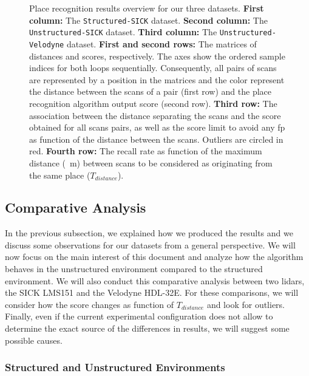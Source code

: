 \begin{figure}[H]
    \caption[Place recognition results overview for our three datasets.]{Place recognition results overview for our three datasets. \textbf{First column:} The \texttt{Structured-SICK} dataset. \textbf{Second column:} The \texttt{Unstructured-SICK} dataset. \textbf{Third column:} The \texttt{Unstructured-Velodyne} dataset. \textbf{First and second rows:} The matrices of distances and scores, respectively. The axes show the ordered sample indices for both loops sequentially. Consequently, all pairs of scans are represented by a position in the matrices and the color represent the distance between the scans of a pair (first row) and the place recognition algorithm output score (second row). \textbf{Third row:} The association between the distance separating the scans and the score obtained for all scans pairs, as well as the score limit to avoid any \gls*{fp} as function of the distance between the scans. Outliers are circled in red. \textbf{Fourth row:} The recall rate as function of the maximum distance (\SI{}{\meter}) between scans to be considered as originating from the same place ($T_{distance}$).} 
    \label{fig:chap_slam_results}
\end{figure}

\subsection{Comparative Analysis}
\label{ssec:chap_slam_comparative_analysis}

In the previous subsection, we explained how we produced the results and we discuss some observations for our datasets from a general perspective. We will now focus on the main interest of this document and analyze how the algorithm behaves in the unstructured environment compared to the structured environment. We will also conduct this comparative analysis between two \gls*{lidar}s, the SICK LMS151 and the Velodyne HDL-32E. For these comparisons, we will consider how the score changes as function of $T_{distance}$ and look for outliers. Finally, even if the current experimental configuration does not allow to determine the exact source of the differences in results, we will suggest some possible causes.


\subsubsection{Structured and Unstructured Environments}
\label{ssec:chap_slam_struct_vs_forest}

